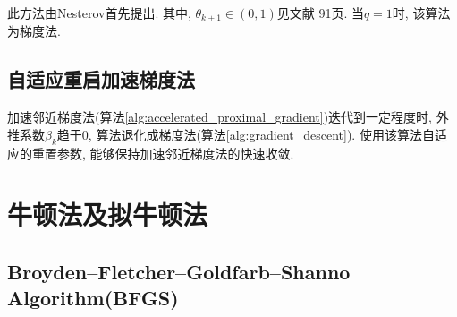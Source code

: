 此方法由Nesterov\cite{nesterov1983method}首先提出. 其中, $\theta_{k+1}\in (0,1)$见文献\cite{nesterov1998introductory} 91页. 当$q=1$时, 该算法为梯度法.



\subsection{自适应重启加速梯度法}

加速邻近梯度法(算法\ref{alg:accelerated_proximal_gradient})迭代到一定程度时, 外推系数$\beta_k$趋于0, 算法退化成梯度法(算法\ref{alg:gradient_descent}). 使用该算法自适应的重置参数, 能够保持加速邻近梯度法的快速收敛.







\section{牛顿法及拟牛顿法}

\subsection{Broyden–Fletcher–Goldfarb–Shanno Algorithm(BFGS)}